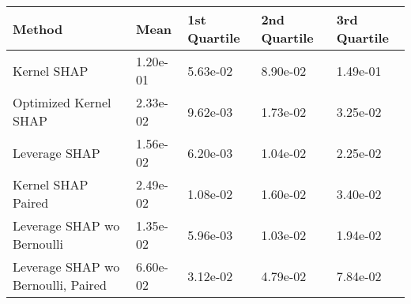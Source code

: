 \begin{tabular}{lllll}
  \toprule
  \textbf{Method} & \textbf{Mean} & \textbf{1st Quartile} & \textbf{2nd Quartile} & \textbf{3rd Quartile} \\ \midrule 
Kernel SHAP & 1.20e-01 & 5.63e-02 & 8.90e-02 & 1.49e-01\\
Optimized Kernel SHAP & \cellcolor{bronze!60}2.33e-02 & \cellcolor{bronze!60}9.62e-03 & 1.73e-02 & \cellcolor{bronze!60}3.25e-02\\
Leverage SHAP & \cellcolor{silver!60}1.56e-02 & \cellcolor{silver!60}6.20e-03 & \cellcolor{silver!60}1.04e-02 & \cellcolor{silver!60}2.25e-02\\
Kernel SHAP Paired & 2.49e-02 & 1.08e-02 & \cellcolor{bronze!60}1.60e-02 & 3.40e-02\\
Leverage SHAP wo Bernoulli & \cellcolor{gold!60}1.35e-02 & \cellcolor{gold!60}5.96e-03 & \cellcolor{gold!60}1.03e-02 & \cellcolor{gold!60}1.94e-02\\
Leverage SHAP wo Bernoulli, Paired & 6.60e-02 & 3.12e-02 & 4.79e-02 & 7.84e-02\\
\bottomrule
\end{tabular}